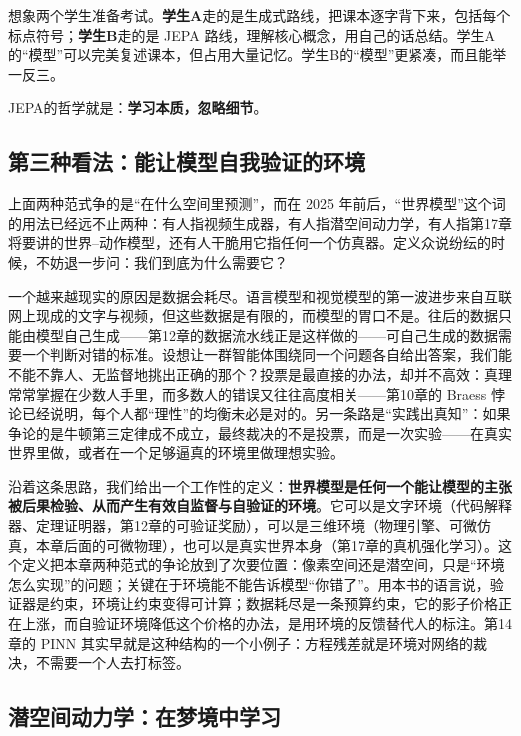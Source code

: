 \begin{example}[类比：记忆 vs 理解]
想象两个学生准备考试。\textbf{学生A}走的是生成式路线，把课本逐字背下来，包括每个标点符号；\textbf{学生B}走的是 JEPA 路线，理解核心概念，用自己的话总结。学生A的“模型”可以完美复述课本，但占用大量记忆。学生B的“模型”更紧凑，而且能举一反三。

JEPA的哲学就是：\textbf{学习本质，忽略细节}。
\end{example}

\subsection{第三种看法：能让模型自我验证的环境}

上面两种范式争的是“在什么空间里预测”，而在 2025 年前后，“世界模型”这个词的用法已经远不止两种：有人指视频生成器，有人指潜空间动力学，有人指第17章将要讲的世界--动作模型，还有人干脆用它指任何一个仿真器。定义众说纷纭的时候，不妨退一步问：我们到底为什么需要它？

一个越来越现实的原因是数据会耗尽。语言模型和视觉模型的第一波进步来自互联网上现成的文字与视频，但这些数据是有限的，而模型的胃口不是。往后的数据只能由模型自己生成——第12章的数据流水线正是这样做的——可自己生成的数据需要一个判断对错的标准。设想让一群智能体围绕同一个问题各自给出答案，我们能不能不靠人、无监督地挑出正确的那个？投票是最直接的办法，却并不高效：真理常常掌握在少数人手里，而多数人的错误又往往高度相关——第10章的 Braess 悖论已经说明，每个人都“理性”的均衡未必是对的。另一条路是“实践出真知”：如果争论的是牛顿第三定律成不成立，最终裁决的不是投票，而是一次实验——在真实世界里做，或者在一个足够逼真的环境里做理想实验。

沿着这条思路，我们给出一个工作性的定义：\textbf{世界模型是任何一个能让模型的主张被后果检验、从而产生有效自监督与自验证的环境}。它可以是文字环境（代码解释器、定理证明器，第12章的可验证奖励），可以是三维环境（物理引擎、可微仿真，本章后面的可微物理），也可以是真实世界本身（第17章的真机强化学习）。这个定义把本章两种范式的争论放到了次要位置：像素空间还是潜空间，只是“环境怎么实现”的问题；关键在于环境能不能告诉模型“你错了”。用本书的语言说，验证器是约束，环境让约束变得可计算；数据耗尽是一条预算约束，它的影子价格正在上涨，而自验证环境降低这个价格的办法，是用环境的反馈替代人的标注。第14章的 PINN 其实早就是这种结构的一个小例子：方程残差就是环境对网络的裁决，不需要一个人去打标签。

\subsection{潜空间动力学：在梦境中学习}

